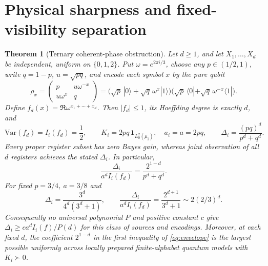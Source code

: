 \documentclass[11pt]{article}
\newtheorem{theorem}{Theorem}
\newcommand{\id}{\mathbf 1}
\begin{document}
\section{Physical sharpness and fixed-visibility separation}
\begin{theorem}[Ternary coherent-phase obstruction]\label{thm:ternary}
Let $d\ge1$, and let $X_1,\dots,X_d$ be independent, uniform on $\{0,1,2\}$. Put $\omega=e^{2\pi i/3}$, choose any $p\in(1/2,1)$, write $q=1-p$, $u=\sqrt{pq}$, and encode each symbol $x$ by the pure qubit
\[
 \rho_x=\begin{pmatrix}p&u\omega^{-x}\\u\omega^x&q\end{pmatrix}
 =\bigl(\sqrt p\,|0\rangle+\sqrt q\,\omega^x|1\rangle\bigr)
 \bigl(\sqrt p\,\langle0|+\sqrt q\,\omega^{-x}\langle1|\bigr).
\]
Define $f_d(x)=\Re\omega^{x_1+\cdots+x_d}$. Then $|f_d|\le1$, its Hoeffding degree is exactly $d$, and
\begin{equation}\label{eq:exact}
 \mathrm{Var}(f_d)=I_i(f_d)=\frac12,\qquad
 K_i=2pq\,\id_{L_0^2(\mu_i)},\quad a_i=a=2pq,
 \qquad\Delta_i=\frac{(pq)^d}{p^d+q^d}.
\end{equation}
Every proper register subset has zero Bayes gain, whereas joint observation of all $d$ registers achieves the stated $\Delta_i$. In particular,
\begin{equation}\label{eq:ratio}
 \boxed{\frac{\Delta_i}{a^d I_i(f_d)}=\frac{2^{1-d}}{p^d+q^d}.}
\end{equation}
For fixed $p=3/4$, $a=3/8$ and
\begin{equation}\label{eq:fixed}
 \boxed{\Delta_i=\frac{3^d}{4^d(3^d+1)},\qquad
 \frac{\Delta_i}{a^dI_i(f_d)}=\frac{2^{d+1}}{3^d+1}\sim2(2/3)^d.}
\end{equation}
Consequently no universal polynomial $P$ and positive constant $c$ give $\Delta_i\ge c a^d I_i(f)/P(d)$ for this class of sources and encodings. Moreover, at each fixed $d$, the coefficient $2^{1-d}$ in the first inequality of \eqref{eq:envelope} is the largest possible uniformly across locally prepared finite-alphabet quantum models with $K_i\succ0$.
\end{theorem}
\end{document}
